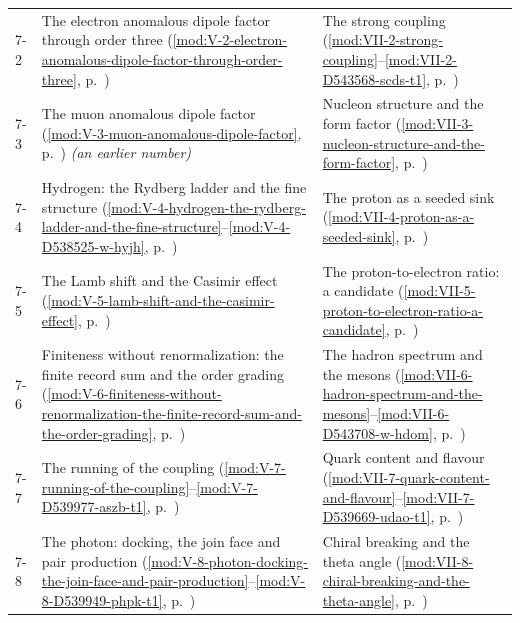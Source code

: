 {\begin{longtable}{p{11mm}p{70mm}p{60mm}}
7-2 & The electron anomalous dipole factor through order three (\ref{mod:V-2-electron-anomalous-dipole-factor-through-order-three}, p.~\pageref{mod:V-2-electron-anomalous-dipole-factor-through-order-three}) & The strong coupling (\ref{mod:VII-2-strong-coupling}--\ref{mod:VII-2-D543568-scds-t1}, p.~\pageref{mod:VII-2-strong-coupling}) \\
7-3 & The muon anomalous dipole factor (\ref{mod:V-3-muon-anomalous-dipole-factor}, p.~\pageref{mod:V-3-muon-anomalous-dipole-factor}) \emph{(an earlier number)} & Nucleon structure and the form factor (\ref{mod:VII-3-nucleon-structure-and-the-form-factor}, p.~\pageref{mod:VII-3-nucleon-structure-and-the-form-factor}) \\
7-4 & Hydrogen: the Rydberg ladder and the fine structure (\ref{mod:V-4-hydrogen-the-rydberg-ladder-and-the-fine-structure}--\ref{mod:V-4-D538525-w-hyjh}, p.~\pageref{mod:V-4-hydrogen-the-rydberg-ladder-and-the-fine-structure}) & The proton as a seeded sink (\ref{mod:VII-4-proton-as-a-seeded-sink}, p.~\pageref{mod:VII-4-proton-as-a-seeded-sink}) \\
7-5 & The Lamb shift and the Casimir effect (\ref{mod:V-5-lamb-shift-and-the-casimir-effect}, p.~\pageref{mod:V-5-lamb-shift-and-the-casimir-effect}) & The proton-to-electron ratio: a candidate (\ref{mod:VII-5-proton-to-electron-ratio-a-candidate}, p.~\pageref{mod:VII-5-proton-to-electron-ratio-a-candidate}) \\
7-6 & Finiteness without renormalization: the finite record sum and the order grading (\ref{mod:V-6-finiteness-without-renormalization-the-finite-record-sum-and-the-order-grading}, p.~\pageref{mod:V-6-finiteness-without-renormalization-the-finite-record-sum-and-the-order-grading}) & The hadron spectrum and the mesons (\ref{mod:VII-6-hadron-spectrum-and-the-mesons}--\ref{mod:VII-6-D543708-w-hdom}, p.~\pageref{mod:VII-6-hadron-spectrum-and-the-mesons}) \\
7-7 & The running of the coupling (\ref{mod:V-7-running-of-the-coupling}--\ref{mod:V-7-D539977-aszb-t1}, p.~\pageref{mod:V-7-running-of-the-coupling}) & Quark content and flavour (\ref{mod:VII-7-quark-content-and-flavour}--\ref{mod:VII-7-D539669-udao-t1}, p.~\pageref{mod:VII-7-quark-content-and-flavour}) \\
7-8 & The photon: docking, the join face and pair production (\ref{mod:V-8-photon-docking-the-join-face-and-pair-production}--\ref{mod:V-8-D539949-phpk-t1}, p.~\pageref{mod:V-8-photon-docking-the-join-face-and-pair-production}) & Chiral breaking and the theta angle (\ref{mod:VII-8-chiral-breaking-and-the-theta-angle}, p.~\pageref{mod:VII-8-chiral-breaking-and-the-theta-angle}) \\

\end{longtable}}
